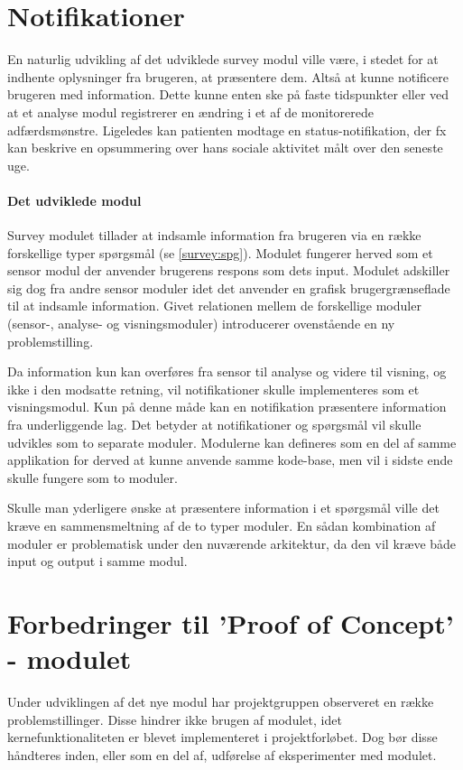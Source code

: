 \section{Notifikationer}
En naturlig udvikling af det udviklede survey modul ville være, i stedet for at indhente oplysninger fra brugeren, at præsentere dem.
Altså at kunne notificere brugeren med information.
Dette kunne enten ske på faste tidspunkter eller ved at et analyse modul registrerer en ændring i et af de monitorerede adfærdsmønstre.
Ligeledes kan patienten modtage en status-notifikation, der fx kan beskrive en opsummering over hans sociale aktivitet målt over den seneste uge.

\paragraph{Det udviklede modul}
Survey modulet tillader at indsamle information fra brugeren via en række forskellige typer spørgsmål (se \cref{survey:spg}).
Modulet fungerer herved som et sensor modul der anvender brugerens respons som dets input.
Modulet adskiller sig dog fra andre sensor moduler idet det anvender en grafisk brugergrænseflade til at indsamle information.
Givet relationen mellem de forskellige moduler (sensor-, analyse- og visningsmoduler) introducerer ovenstående en ny problemstilling.

Da information kun kan overføres fra sensor til analyse og videre til visning, og ikke i den modsatte retning, vil notifikationer skulle implementeres som et visningsmodul.
Kun på denne måde kan en notifikation præsentere information fra underliggende lag.
Det betyder at notifikationer og spørgsmål vil skulle udvikles som to separate moduler.
Modulerne kan defineres som en del af samme applikation for derved at kunne anvende samme kode-base, men vil i sidste ende skulle fungere som to moduler.

Skulle man yderligere ønske at præsentere information i et spørgsmål ville det kræve en sammensmeltning af de to typer moduler.
En sådan kombination af moduler er problematisk under den nuværende arkitektur, da den vil kræve både input og output i samme modul.

\section{Forbedringer til 'Proof of Concept' - modulet}
Under udviklingen af det nye modul har projektgruppen observeret en række problemstillinger.
Disse hindrer ikke brugen af modulet, idet kernefunktionaliteten er blevet implementeret i projektforløbet.
Dog bør disse håndteres inden, eller som en del af, udførelse af eksperimenter med modulet.

